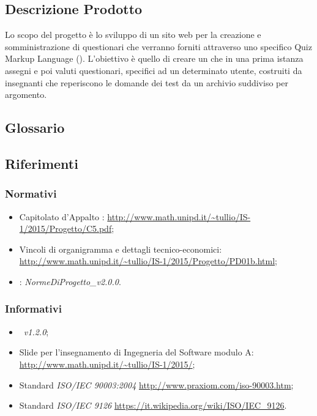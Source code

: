 \documentclass[12pt,a4paper]{article}
\begin{document}
\subsection{Descrizione Prodotto}
Lo scopo del progetto è lo sviluppo di un sito web per la creazione e somministrazione di questionari che verranno forniti attraverso uno specifico Quiz Markup Language (). L'obiettivo è quello di creare un  che in una prima istanza assegni e poi valuti questionari, specifici ad un determinato utente, costruiti da insegnanti che reperiscono le domande dei test da un archivio suddiviso per argomento.

\subsection{Glossario}
\glossarioPrint

\subsection{Riferimenti}

\subsubsection{Normativi}
\begin{itemize}
	\item Capitolato d’Appalto \prjL: \url{http://www.math.unipd.it/~tullio/IS-1/2015/Progetto/C5.pdf};
	\item Vincoli di organigramma e dettagli tecnico-economici: \url{http://www.math.unipd.it/~tullio/IS-1/2015/Progetto/PD01b.html};
	\item \NdP: \textit{NormeDiProgetto_v2.0.0}. 
\end{itemize}

\subsubsection{Informativi}
\begin{itemize}
	\item \PdP\ \textit{v1.2.0};
    \item Slide per l'insegnamento di Ingegneria del Software modulo A: \url{http://www.math.unipd.it/~tullio/IS-1/2015/};
	\item Standard \textit{ISO/IEC 90003:2004} \url{http://www.praxiom.com/iso-90003.htm};
	\item Standard \textit{ISO/IEC 9126} \url{https://it.wikipedia.org/wiki/ISO/IEC_9126}.
\end{itemize}
\end{document}
